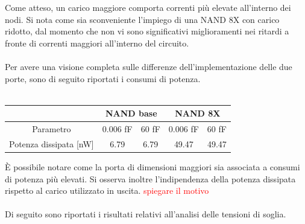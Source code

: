 \documentclass[11pt,  english, makeidx, a4paper, titlepage, oneside]{book}
\begin{document}
\vspace{0.3cm}
Come atteso, un carico maggiore comporta correnti più elevate all'interno dei nodi. Si nota come sia sconveniente l'impiego di una NAND 8X con carico ridotto, dal momento che non vi sono significativi miglioramenti nei ritardi a fronte di correnti maggiori all'interno del circuito.
\\\\
Per avere una visione completa sulle differenze dell'implementazione delle due porte, sono di seguito riportati i consumi di potenza. 
\\\\
\begin{center}
	\begin{tabular}{|c|c|c||c|c|}
	\hline
	& \multicolumn{2}{c}{NAND base} & \multicolumn{2}{c}{NAND 8X}\\
	\hline
	Parametro & 0.006 fF & 60 fF & 0.006 fF & 60 fF \\
	\hline
	Potenza dissipata [nW] & 6.79 & 6.79 & 49.47 & 49.47\\
	\hline
	\end{tabular}	
\end{center}
\vspace{0.3cm}
È possibile notare come la porta di dimensioni maggiori sia associata a consumi di potenza più elevati. Si osserva inoltre l'indipendenza della potenza dissipata rispetto al carico utilizzato in uscita. \textcolor{red}{spiegare il motivo}
\\\\
Di seguito sono riportati i risultati relativi all'analisi delle tensioni di soglia.
\\\\
\end{document}
